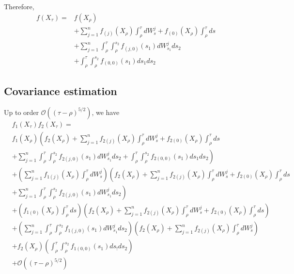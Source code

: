 \documentclass[12pt]{article}
\begin{document}
Therefore, 
\begin{equation} 
\begin{aligned}
f( X_\tau) =& f(X_\rho) \\
& + \sum_{j=1}^n f_{(j)} (X_\rho) \int_\rho^\tau dW_s^j 
  + f_{(0)} (X_\rho) \int_\rho^\tau ds \\
& + \sum_{j=1}^n \int_\rho^\tau \int_\rho^{s_2} f_{(j,0)} (s_1) dW_{s_1}^j ds_2 \\
& + \int_\rho^\tau \int_\rho^{s_2} f_{(0,0)} (s_1) ds_1 ds_2 
\end{aligned}
\end{equation}

\subsection{Covariance estimation}

Up to order $\mathcal{O} ((\tau - \rho)^{5/2})$, we have
\begin{equation}
\begin{aligned}
& f_1(X_\tau) f_2(X_\tau) = \\
&f_1(X_\rho) 
 \left( f_2(X_\rho) 
 + \sum_{j=1}^n f_{2(j)} (X_\rho) \int_\rho^\tau dW_s^j 
 + f_{2(0)} (X_\rho) \int_\rho^\tau ds \right. \\
& \left. + \sum_{j=1}^n \int_\rho^\tau \int_\rho^{s_2} f_{2(j,0)} (s_1) dW_{s_1}^j ds_2 
 + \int_\rho^\tau \int_\rho^{s_2} f_{2(0,0)} (s_1) ds_1 ds_2 \right) \\
 & + \left( \sum_{j=1}^n f_{1(j)}(X_\rho) \int_\rho^\tau dW_s^j \right)
 \left( f_2(X_\rho) 
 + \sum_{j=1}^n f_{2(j)} (X_\rho) \int_\rho^\tau dW_s^j 
 + f_{2(0)} (X_\rho) \int_\rho^\tau ds \right. \\
& \left. + \sum_{j=1}^n \int_\rho^\tau \int_\rho^{s_2} f_{2(j,0)} (s_1) dW_{s_1}^j ds_2 \right) \\
&+ \left( f_{1(0)} (X_\rho) \int_\rho^\tau ds \right)
 \left( f_2(X_\rho) 
 + \sum_{j=1}^n f_{2(j)} (X_\rho) \int_\rho^\tau dW_s^j 
 + f_{2(0)} (X_\rho) \int_\rho^\tau ds \right) \\
& + \left( \sum_{j=1}^n \int_\rho^\tau \int_\rho^{s_2} f_{1(j,0)}(s_1) dW_{s_1}^j ds_2 \right)
 \left( f_2(X_\rho) 
 + \sum_{j=1}^n f_{2(j)} (X_\rho) \int_\rho^\tau dW_s^j  \right) \\
 &+ f_2(X_\rho) \left( \int_\rho^\tau \int_\rho^{s_2} f_{1(0,0)} (s_1) ds_! ds_2 \right)
\\ & + \mathcal{O} ((\tau - \rho)^{5/2})
\end{aligned}
\end{equation}
\end{document}
